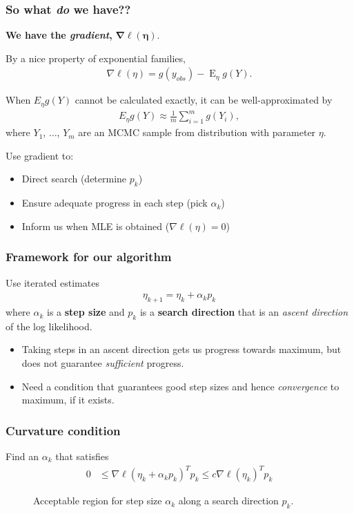 \documentclass[ 10pt]{beamer}
\DeclareMathOperator{\E}{E}
\begin{document}
\frame
{
\frametitle{So what \emph{do} we have??}

{\textbf{We have the \emph{gradient},} $\boldsymbol{\nabla \ell(\eta)}$.}
\vspace*{2mm}

By a nice property of exponential families,
\begin{align*}
	\nabla \ell( \eta ) = g(y_{obs}) - \E_{\eta} g(Y).
\end{align*}

\pause
When $E_\eta g(Y)$ cannot be calculated exactly, it can be well-approximated by
\begin{align*}
E_\eta g(Y) \approx \frac{1}{m}\sum_{i = 1}^m g(Y_i),
\end{align*}
where $Y_1$, $\ldots$, $Y_m$ are an MCMC sample from distribution with parameter $\eta$.
\vspace*{4mm}

\pause
Use gradient to: 
\vspace*{2mm}
\begin{itemize}
\item Direct search  (determine $p_k$)
\vspace*{2mm}

\item Ensure adequate progress  in each step  (pick $\alpha_k$)
\vspace*{2mm}

\item Inform us when MLE is obtained  ($\nabla \ell(\eta) = 0$)
\end{itemize}

}

\frame
{
\frametitle{Framework for our algorithm}
Use iterated estimates
\begin{align*}
	\eta_{k+1} = \eta_k + \alpha_k p_k
\end{align*}
where $\alpha_k$ is a \textbf{step size} and  $p_k$ is a \textbf{search direction} that
is an \emph{ascent direction} of the log likelihood.
\vspace{3mm}

\pause
\begin{itemize}
\item Taking steps in an ascent direction gets us progress towards maximum, but does not guarantee \emph{sufficient} progress.
\vspace{3mm}

\item Need a condition that guarantees good step sizes and hence \emph{convergence} to maximum, if it exists.
\end{itemize}

}
\frame
{
  \frametitle{Curvature condition}
Find an $\alpha_k$ that satisfies
\begin{align*}
	 0 & \leq \nabla \ell( \eta_k + \alpha_k p_k)^T p_k \leq c \nabla \ell(\eta_k)^T 
p_k
\end{align*}
\begin{figure}[h]
\centering
    \scalebox{.25}{}
	\caption{Acceptable region for step size $\alpha_k$ along a search direction $p_k$.}
\label{F:alpha_region}
\end{figure}
}
\end{document}

